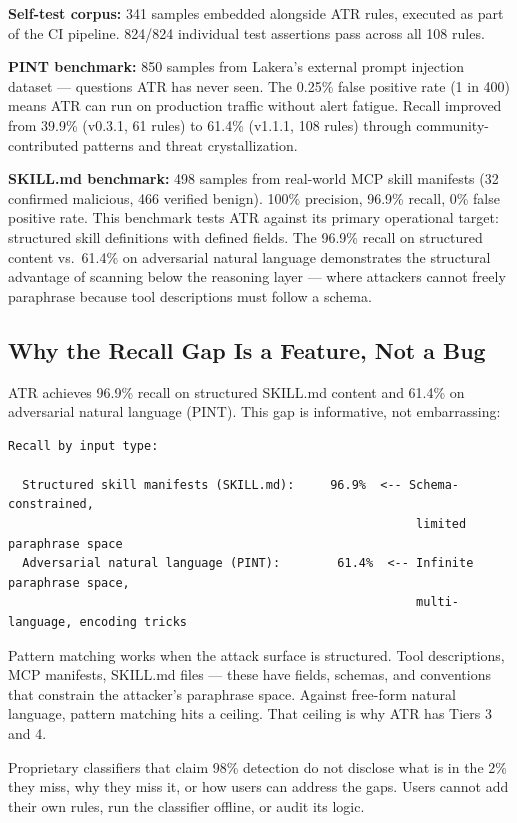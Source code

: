 \documentclass[11pt,letterpaper]{article}
\begin{document}
\textbf{Self-test corpus:} 341 samples embedded alongside ATR rules, executed as part of the CI pipeline. 824/824 individual test assertions pass across all 108 rules.

\textbf{PINT benchmark:} 850 samples from Lakera's external prompt injection dataset \cite{pint} --- questions ATR has never seen. The 0.25\% false positive rate (1 in 400) means ATR can run on production traffic without alert fatigue. Recall improved from 39.9\% (v0.3.1, 61 rules) to 61.4\% (v1.1.1, 108 rules) through community-contributed patterns and threat crystallization.

\textbf{SKILL.md benchmark:} 498 samples from real-world MCP skill manifests (32 confirmed malicious, 466 verified benign). 100\% precision, 96.9\% recall, 0\% false positive rate. This benchmark tests ATR against its primary operational target: structured skill definitions with defined fields. The 96.9\% recall on structured content vs.\ 61.4\% on adversarial natural language demonstrates the structural advantage of scanning below the reasoning layer --- where attackers cannot freely paraphrase because tool descriptions must follow a schema.


\subsection{Why the Recall Gap Is a Feature, Not a Bug}

ATR achieves 96.9\% recall on structured SKILL.md content and 61.4\% on adversarial natural language (PINT). This gap is informative, not embarrassing:

\begin{lstlisting}
Recall by input type:

  Structured skill manifests (SKILL.md):     96.9%  <-- Schema-constrained,
                                                         limited paraphrase space
  Adversarial natural language (PINT):        61.4%  <-- Infinite paraphrase space,
                                                         multi-language, encoding tricks
\end{lstlisting}

Pattern matching works when the attack surface is structured. Tool descriptions, MCP manifests, SKILL.md files --- these have fields, schemas, and conventions that constrain the attacker's paraphrase space. Against free-form natural language, pattern matching hits a ceiling. That ceiling is why ATR has Tiers 3 and 4.

Proprietary classifiers that claim 98\% detection do not disclose what is in the 2\% they miss, why they miss it, or how users can address the gaps. Users cannot add their own rules, run the classifier offline, or audit its logic.
\end{document}
